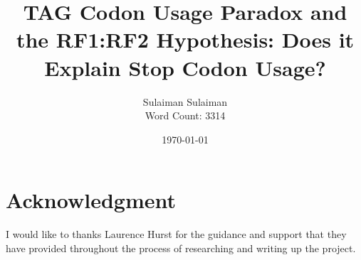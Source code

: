 \documentclass[
    emulatestandardclasses,
    parskip=half,
]{scrartcl}
\begin{document}
    \title{TAG Codon Usage Paradox and the RF1:RF2 Hypothesis: Does it Explain Stop Codon Usage?}
    \date{\today}
    \author{Sulaiman Sulaiman \\ Word Count: 3314}
    \maketitle

    
    

    \pagebreak
    
    
    \pagebreak
    \pagebreak\section*{Acknowledgment}
        I would like to thanks Laurence Hurst for the guidance and support that they have provided throughout the process of researching and writing up the project.

	\newpage {}
    \nocite{anaconda,SciPy,NumPy,pandas,biopython,statsmodels,matplotlib,R,tidyverse,ggrepel,tqdm,gffutils}
    \newrefcontext[sorting=nty]
    \printbibliography[notkeyword=software]
	\printbibliography[keyword=software, title={Software \& Libraries}]
\end{document}
